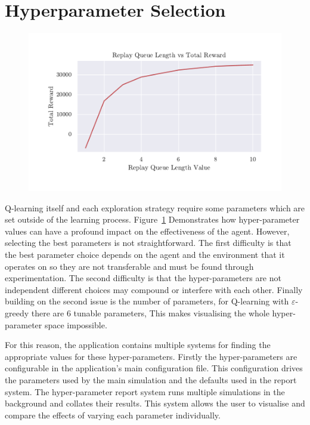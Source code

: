 \documentclass[]{final_report}
\begin{document}
\section{Hyperparameter Selection}

\begin{figure}[H]
  \centering
  
  \includegraphics[trim={0 1cm 0 1cm},clip,width=\textwidth]{hyper-paramiters/replay-queue-length.pdf}
  
  \caption{\label{fig:replay-queue-length}}
\end{figure}

Q-learning itself and each exploration strategy require some parameters which are set outside of the learning process. Figure~\ref{fig:replay-queue-length} Demonstrates how hyper-parameter values can have a profound impact on the effectiveness of the agent. However, selecting the best parameters is not straightforward. The first difficulty is that the best parameter choice depends on the agent and the environment that it operates on so they are not transferable and must be found through experimentation. The second difficulty is that the hyper-parameters are not independent different choices may compound or interfere with each other.  Finally building on the second issue is the number of parameters, for Q-learning with $\varepsilon$-greedy there are 6 tunable parameters, This makes visualising the whole hyper-parameter space impossible. 


For this reason, the application contains multiple systems for finding the appropriate values for these hyper-parameters. Firstly the hyper-parameters are configurable in the application's main configuration file. This configuration drives the parameters used by the main simulation and the defaults used in the report system. The hyper-parameter report system runs multiple simulations in the background and collates their results. This system allows the user to visualise and compare the effects of varying each parameter individually. 
\end{document}
